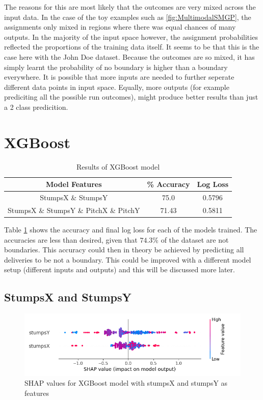 \documentclass[12pt,a4paper]{report}
\theoremstyle{definition}
\begin{document}
The reasons for this are most likely that the outcomes are very mixed across the input data. 
In the case of the toy examples such as \ref{fig:MultimodalSMGP}, the assignments only mixed in regions where there was equal chances of many outputs. 
In the majority of the input space however, the assignment probabilities reflected the proportions of the training data itself.
It seems to be that this is the case here with the John Doe dataset.
Because the outcomes are so mixed, it has simply learnt the probability of no boundary is higher than a boundary everywhere.
It is possible that more inputs are needed to further seperate different data points in input space.
Equally, more outputs (for example prediciting all the possible run outcomes), might produce better results than just a 2 class predicition.

\section{XGBoost}

\begin{table}[H] \label{tab:XGResults}
	\centering
	\caption{Results of XGBoost model}
	\begin{tabular}{| c | c | c |} 
		\hline
		Model Features & \% Accuracy & Log Loss \\ [0.5ex] 
		\hline\hline
		StumpsX \& StumpsY & 75.0 & 0.5796 \\
		\hline
		StumpsX \& StumpsY \& PitchX \& PitchY & 71.43 & 0.5811 \\ [1ex]
		\hline
	\end{tabular}
\end{table}

Table \ref{tab:XGResults} shows the accuracy and final log loss for each of the models trained. 
The accuracies are less than desired, given that $74.3\%$ of the dataset are not boundaries.
This accuracy could then in theory be achieved by predicting all deliveries to be not a boundary.
This could be improved with a different model setup (different inputs and outputs) and this will be discussed more later.

\subsection{StumpsX and StumpsY}

\begin{figure}[H]
    \centering
    \includegraphics[width=\linewidth]{shap_stumps.png}
    \caption{SHAP values for XGBoost model with stumpsX and stumpsY as features}
    \label{fig:ShapStumps}
\end{figure}
\end{document}
